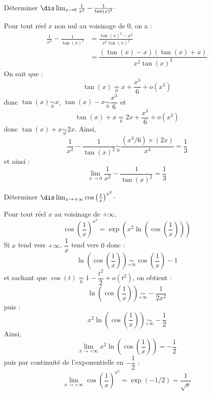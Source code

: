 \documentclass[a4paper,10pt]{report}
\begin{document}
\begin{Exa} Déterminer $\dis \lim_{x \rightarrow 0} \frac{1}{x^2} - \frac{1}{\tan(x)^2} \cdot$
\end{Exa} 

\corr Pour tout réel $x$ non nul au voisinage de $0$, on a :
\begin{align*}
\frac{1}{x^2} - \frac{1}{\tan(x)^2} & = \frac{\tan(x)^2-x^2}{x^2 \tan(x)^2} \\
& = \dfrac{(\tan(x)-x)(\tan(x)+x)}{x^2 \tan(x)^2} 
\end{align*}
On sait que :
$$ \tan(x) \underset{0}{=} x + \dfrac{x^3}{6} + o(x^3)$$
donc $\tan(x) \underset{0}{\sim} x$, $\tan(x)-x \underset{0}{\sim} \dfrac{x^3}{6}$ et 
$$ \tan(x)+x \underset{0}{=} 2x + \dfrac{x^3}{6} + o(x^3)$$
donc $\tan(x)+x \underset{0}{\sim} 2x$. Ainsi,
$$ \frac{1}{x^2} - \frac{1}{\tan(x)^2} \underset{0}{\sim} \dfrac{(x^3/6) \times(2x)}{x^4} = \dfrac{1}{3}$$
et ainsi :
$$ \lim_{x \rightarrow 0} \frac{1}{x^2} - \frac{1}{\tan(x)^2} = \dfrac{1}{3}$$

\medskip

\begin{Exa} Déterminer $\dis \lim_{x \rightarrow + \infty}  \cos \left( \frac{1}{x} \right)^{x^2} \cdot$
\end{Exa}

\corr Pour tout réel $x$ au voisinage de $+ \infty$,
$$ \cos \left( \frac{1}{x} \right)^{x^2} = \exp \left(x^2 \ln \left( \cos \left( \dfrac{1}{x} \right) \right) \right)$$
Si $x$ tend vers $+ \infty$, $\dfrac{1}{x}$ tend vers $0$ donc :
$$ \ln \left( \cos \left( \dfrac{1}{x} \right) \right) \underset{+ \infty}{\sim} \cos \left( \dfrac{1}{x} \right) - 1 $$
et sachant que $\cos(t) \underset{0}{=} 1 - \dfrac{t^2}{2}+ o(t^2)$, on obtient :
$$  \ln \left( \cos \left( \dfrac{1}{x} \right) \right) \underset{+ \infty}{\sim} - \dfrac{1}{2x^2}$$
puis :
$$ x^2 \ln \left( \cos \left( \dfrac{1}{x} \right) \right) \underset{+ \infty}{\sim} - \dfrac{1}{2}$$
Ainsi,
$$ \lim_{x \rightarrow + \infty} x^2 \ln \left( \cos \left( \dfrac{1}{x} \right) \right) = -\dfrac{1}{2}$$
puis par continuité de l'exponentielle en $-\dfrac{1}{2}$ :
$$ \lim_{x \rightarrow + \infty}  \cos \left( \frac{1}{x} \right)^{x^2} = \exp(-1/2) = \dfrac{1}{\sqrt{e}}$$

\medskip
\end{document}
